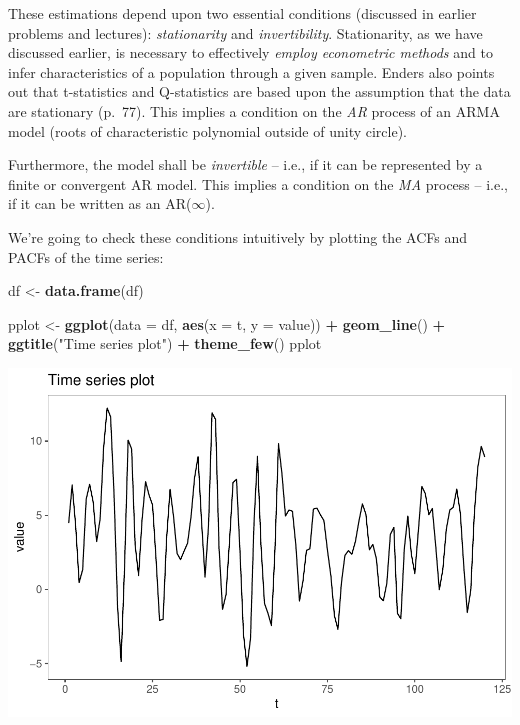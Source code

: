\documentclass[11pt, a4paper]{report}
\newenvironment{Shaded}{\begin{snugshade}}{\end{snugshade}}
\newcommand{\DataTypeTok}[1]{\textcolor[rgb]{0.13,0.29,0.53}{#1}}
\newcommand{\KeywordTok}[1]{\textcolor[rgb]{0.13,0.29,0.53}{\textbf{#1}}}
\newcommand{\NormalTok}[1]{#1}
\newcommand{\OperatorTok}[1]{\textcolor[rgb]{0.81,0.36,0.00}{\textbf{#1}}}
\newcommand{\StringTok}[1]{\textcolor[rgb]{0.31,0.60,0.02}{#1}}
\theoremstyle{plain}
\theoremstyle{plain}
\theoremstyle{remark}
\begin{document}
These estimations depend upon two essential conditions (discussed in
earlier problems and lectures): \emph{stationarity} and
\emph{invertibility}. Stationarity, as we have discussed earlier, is
necessary to effectively \emph{employ econometric methods} and to infer
characteristics of a population through a given sample. Enders also
points out that t-statistics and Q-statistics are based upon the
assumption that the data are stationary (p.~77). This implies a
condition on the \emph{AR} process of an ARMA model (roots of
characteristic polynomial outside of unity circle).

Furthermore, the model shall be \emph{invertible} -- i.e., if it can be
represented by a finite or convergent AR model. This implies a condition
on the \emph{MA} process -- i.e., if it can be written as an
AR(\(\infty\)).

We're going to check these conditions intuitively by plotting the ACFs
and PACFs of the time series:

\begin{Shaded}
	\begin{Highlighting}[]
		\NormalTok{df <-}\StringTok{ }\KeywordTok{data.frame}\NormalTok{(df)}
		
		\NormalTok{pplot <-}\StringTok{ }\KeywordTok{ggplot}\NormalTok{(}\DataTypeTok{data =}\NormalTok{ df, }\KeywordTok{aes}\NormalTok{(}\DataTypeTok{x =}\NormalTok{ t, }\DataTypeTok{y =}\NormalTok{ value)) }\OperatorTok{+}\StringTok{ }\KeywordTok{geom_line}\NormalTok{() }\OperatorTok{+}\StringTok{ }
		\StringTok{    }\KeywordTok{ggtitle}\NormalTok{(}\StringTok{"Time series plot"}\NormalTok{) }\OperatorTok{+}\StringTok{ }\KeywordTok{theme_few}\NormalTok{()}
		\NormalTok{pplot}
	\end{Highlighting}
\end{Shaded}

\begin{center}\includegraphics{Econo2_P3_files/figure-latex/plots-1} \end{center}
\end{document}
